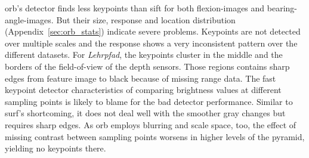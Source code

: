 \begin{table}[H]
    {\renewcommand{\arraystretch}{1.2}%
    \setlength{\tabcolsep}{0.3em}%
    \footnotesize

    }
    \caption[Keypoint and matching results for \texttt{\acrshort{orb}/raw/default}]{\emph{Keypoint and matching results for \texttt{\acrshort{orb}/raw/default}.} The high number of false negatives and the low Youden index are an indicator for problems of the algorithm. The amount of additional keypoints for \glspl{flexion-image} is lower than for \acrshort{sift}.}
\end{table}
\acrshort{orb}'s detector finds less keypoints than \acrshort{sift} for both \glspl{flexion-image} and \glspl{bearing-angle-image}.
But their size, response and location distribution (Appendix~\ref{sec:orb_stats}) indicate severe problems.
Keypoints are not detected over multiple scales and the response shows a very inconsistent pattern over the different datasets.
For \emph{Lehrpfad}, the keypoints cluster in the middle and the borders of the field-of-view of the depth sensors.
Those regions contains sharp edges from feature image to black because of missing range data.
The \acrshort{fast} keypoint detector characteristics of comparing brightness values at different sampling points is likely to blame for the bad detector performance.
Similar to \acrshort{surf}'s shortcoming, it does not deal well with the smoother gray changes but requires sharp edges.
As \acrshort{orb} employs blurring and scale space, too, the effect of missing contrast between sampling points worsens in higher levels of the pyramid, yielding no keypoints there.
